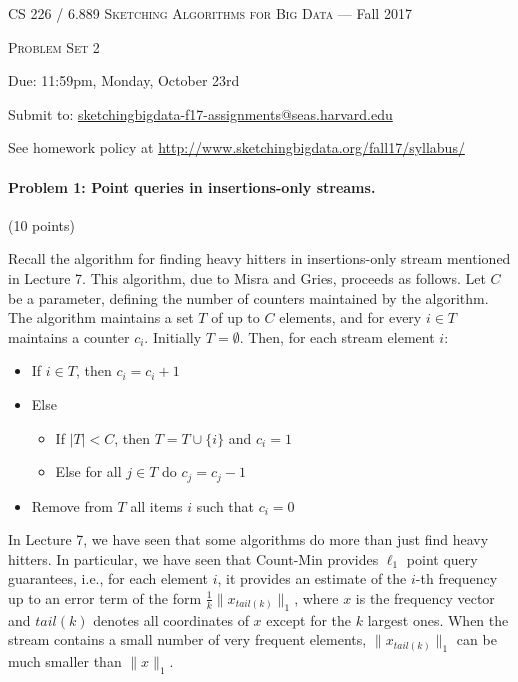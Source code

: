 \documentclass[12pt]{article}
\begin{document}
\thispagestyle{empty}

\begin{center}
{\Large \textsc{CS 226 / 6.889 Sketching Algorithms for Big Data} --- Fall 2017}

\bigskip

{\Large \textsc{Problem Set 2}}

\smallskip

Due: 11:59pm, Monday, October 23rd

Submit to: \url{sketchingbigdata-f17-assignments@seas.harvard.edu}

\bigskip

{\footnotesize See homework policy at \url{http://www.sketchingbigdata.org/fall17/syllabus/}}
\end{center}

\paragraph{Problem 1: Point queries in insertions-only streams.} (10 points)

Recall the algorithm for finding heavy hitters in insertions-only stream mentioned in Lecture 7. This algorithm, due to Misra and Gries, proceeds as follows. Let $C$ be a parameter, defining the number of counters maintained by the algorithm. The algorithm maintains a set $T$ of up to $C$ elements, and for every $i \in T$ maintains a counter $c_i$. Initially $T=\emptyset$. Then, for each stream element $i$:
\begin{itemize}
\item If $i \in T$, then $c_i=c_i+1$
\item Else
\begin{itemize}
\item If $|T|<C$, then $T=T \cup \{i\}$ and $c_i=1$
\item Else for all $j \in T$ do $c_j=c_j-1$
\end{itemize}
\item Remove from $T$ all items $i$ such that $c_i=0$
\end{itemize}

In Lecture 7, we have seen that some algorithms  do more than just find heavy hitters. In particular, we have seen that Count-Min provides $\ell_1$ point query guarantees, i.e., for each element $i$, it provides an estimate of the $i$-th frequency up to an error term of the form $\frac{1}{k} \|x_{tail(k)}\|_1$, where $x$ is the frequency vector and $tail(k)$ denotes all coordinates of $x$ except for the $k$ largest ones. When the stream contains a small number of very frequent elements, 
$\|x_{tail(k)}\|_1$ can be much smaller than $\|x\|_1$.
\end{document}
